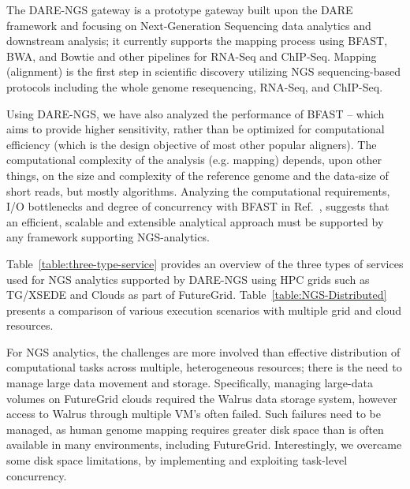\documentclass[]{svjour3}
\begin{document}
The DARE-NGS gateway %
is a prototype gateway built upon the DARE framework and focusing on
Next-Generation Sequencing data analytics and downstream analysis; it
currently supports the mapping process using BFAST, BWA, and Bowtie
and other pipelines for RNA-Seq and
ChIP-Seq\cite{mardis2008-arghg,ecmls_ccpe10}. Mapping (alignment) is
the first step in scientific discovery utilizing NGS sequencing-based
protocols including the whole genome resequencing, RNA-Seq, and
ChIP-Seq.

Using DARE-NGS, we have also analyzed the performance of BFAST --
which aims to provide higher sensitivity, rather than be optimized for
computational efficiency (which is the design objective of most other
popular aligners).  The computational complexity of the analysis
(e.g. mapping) depends, upon other things, on the size and complexity
of the reference genome and the data-size of short reads, but mostly
algorithms. Analyzing the computational requirements, I/O bottlenecks
and degree of concurrency with BFAST in Ref.~\cite{dare-ecmls11},
suggests that an efficient, scalable and extensible analytical
approach must be supported by any framework supporting NGS-analytics.

Table~\ref{table:three-type-service} provides an overview of the three
types of services used for NGS analytics supported by DARE-NGS using
HPC grids such as TG/XSEDE and Clouds as part of
FutureGrid\cite{dare-ecmls11}.  Table~\ref{table:NGS-Distributed}
presents a comparison of various execution scenarios with multiple
grid and cloud resources.

For NGS analytics, the challenges are more involved than effective
distribution of computational tasks across multiple, heterogeneous
resources; there is the need to manage large data movement and
storage.  Specifically, managing large-data volumes on FutureGrid
clouds required the Walrus data storage system\cite{walrusurl}, however access to Walrus through
multiple VM's often failed.  Such failures need to be managed, as
human genome mapping requires greater disk space than is often
available in many environments, including FutureGrid. Interestingly,
we overcame some disk space limitations, by implementing and
exploiting task-level concurrency.

\end{document}
